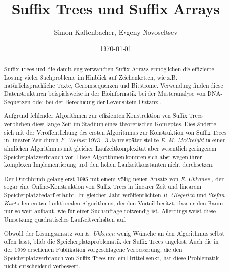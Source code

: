 \documentclass[12pt]{report}
\title{Suffix Trees und Suffix Arrays}
\author{Simon Kaltenbacher, Evgeny Novoseltsev}
\date{\today}
\begin{document}
\maketitle

\tableofcontents

\renewcommand{\abstractname}{Einführung}
\begin{abstract}
Suffix Trees und die damit eng verwandten Suffix Arrays ermöglichen die effiziente Lösung vieler Suchprobleme im Hinblick auf Zeichenketten, wie z.B. natürlichsprachliche Texte, Genomsequenzen und Bitströme. Verwendung finden diese Datenstrukturen beispielsweise in der Bioinformatik bei der Musteranalyse von DNA-Sequenzen \cite{Aluru2006} oder bei der Berechnung der Levenshtein-Distanz \cite{Gusfield1997}.

Aufgrund fehlender Algorithmen zur effizienten Konstruktion von Suffix Trees verblieben diese lange Zeit im Stadium eines theoretischen Konzeptes. Dies änderte sich mit der Veröffentlichung des ersten Algorithmus zur Konstruktion von Suffix Trees in linearer Zeit durch \textit{P. Weiner} 1973 \cite{Weiner1973}. 3 Jahre später stellte \textit{E. M. McCreight} in \cite{McCreight1976} einen ähnlichen Algorithmus mit gleicher Laufzeitkomplexität aber wesentlich geringerem Speicherplatzverbrauch vor. Diese Algorithmen konnten sich aber wegen ihrer komplexen Implementierung und den hohen Laufzeitkonstanten nicht durchsetzen.

Der Durchbruch gelang erst 1995 mit einem völlig neuen Ansatz von \textit{E. Ukkonen} \cite{Ukkonen1995}, der sogar eine Online-Konstruktion von Suffix Trees in linearer Zeit und linearem Speicherplatzbedarf erlaubt. Im gleichen Jahr veröffentlichten \textit{R. Giegerich} und \textit{Stefan Kurtz} \cite{Giegerich1995} den ersten funktionalen Algorithmus, der den Vorteil besitzt, dass er den Baum nur so weit aufbaut, wie für einer Suchanfrage notwendig ist. Allerdings weist diese Umsetzung quadratisches Laufzeitverhalten auf.

Obwohl der Lösungsansatz von \textit{E. Ukkonen} wenig Wünsche an den Algorithmus selbst offen lässt, blieb die Speicherplatzproblematik der Suffix Trees ungelöst. Auch die in der 1999 erschienen Publikation \cite{Giegerich1999} vorgeschlagene Verbesserung, die den Speicherplatzverbrauch von Suffix Trees um ein Drittel senkt, hat diese Problematik nicht entscheidend verbessert.


\end{abstract}
\end{document}

